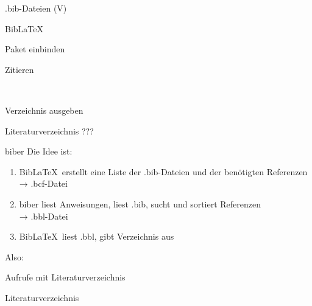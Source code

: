 \begin{frame}{.bib-Dateien (V)}
  \bibexamplev
\end{frame}

\begin{frame}[fragile]{Bib\LaTeX}
  \begin{block}{Paket einbinden}
    \begin{lstverbatim}
    \usepackage{biblatex}
    
    \end{lstverbatim}
  \end{block}
  \begin{block}{Zitieren}
      \begin{minipage}{0.6\linewidth}
        \begin{lstverbatim}
        \cite{numpy}
        \cite{splot,root}
        \end{lstverbatim}
      \end{minipage}
      \begin{minipage}{0.35\linewidth}
        \cite{numpy}\\
        \cite{splot,root}
      \end{minipage}
  \end{block}
  \begin{block}{Verzeichnis ausgeben}
    \begin{lstverbatim}
    \nocite{anleitung01} %
    \nocite{*}           %
    \printbibliography
    \end{lstverbatim}
  \end{block}
\end{frame}

\begin{frame}{Literaturverzeichnis}
  \centering
  \pause
  \Huge ???
\end{frame}

\begin{frame}[fragile]{biber}
  Die Idee ist:
  \begin{enumerate}
    \item Bib\LaTeX\ erstellt eine Liste der .bib-Dateien und der benötigten Referenzen\\
          → .bcf-Datei
    \item biber liest Anweisungen, liest .bib, sucht und sortiert Referenzen\\
          → .bbl-Datei
    \item Bib\LaTeX\ liest .bbl, gibt Verzeichnis aus
  \end{enumerate}

  \vspace{10pt}
  Also:
  \begin{block}{Aufrufe mit Literaturverzeichnis}
  \end{block}
\end{frame}

\begin{frame}{Literaturverzeichnis}
  \nocite{*}
  \printbibliography
\end{frame}
